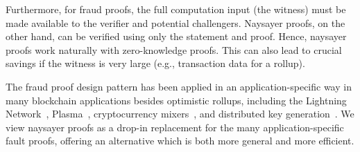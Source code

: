 Furthermore, for fraud proofs, the full computation input (the witness) must be made available to the verifier and potential challengers. %
Naysayer proofs, on the other hand, 
can be verified using only the statement and proof. 
Hence, naysayer proofs work naturally with zero-knowledge proofs.
This can also lead to crucial savings if the witness is very large %
(e.g., transaction data for a rollup).

The fraud proof design pattern has been applied in an application-specific way in many blockchain applications besides optimistic rollups, including the Lightning Network~\cite{PooDry16}, Plasma~\cite{PooBut17}, cryptocurrency mixers~\cite{EPRINT:SNBB19}, and distributed key generation~\cite{EPRINT:SJSW19}. We view naysayer proofs as a drop-in replacement for the many application-specific fault proofs, offering an alternative which is both more general and more efficient.